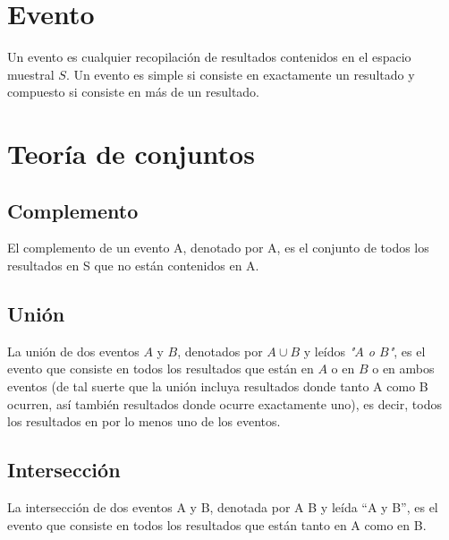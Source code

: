 \documentclass{report}
\begin{document}
    \section*{Evento}
    Un evento es cualquier recopilación de resultados contenidos en el espacio 
    muestral $S$. Un evento es simple si consiste en exactamente un resultado y 
    compuesto si consiste en más de un resultado.

    \section*{Teoría de conjuntos}

      \subsection*{Complemento}
      El complemento de un evento A, denotado por A, es el conjunto de todos los 
      resultados en S que no están contenidos en A. 

      \subsection*{Unión}
      La unión de dos eventos $A$ y $B$, denotados por $A\cup B$ y leídos \textit{"$A$ o $B$"}, es el 
      evento que consiste en todos los resultados que están en $A$ o en $B$ o en ambos 
      eventos (de tal suerte que la unión incluya resultados donde tanto A como B 
      ocurren, así también resultados donde ocurre exactamente uno), es decir, todos 
      los resultados en por lo menos uno de los eventos.

      \subsection*{Intersección}
      La intersección de dos eventos A y B, denotada por A  B y leída “A y B”, 
      es el evento que consiste en todos los resultados que están tanto en A 
      como en B.
\end{document}
